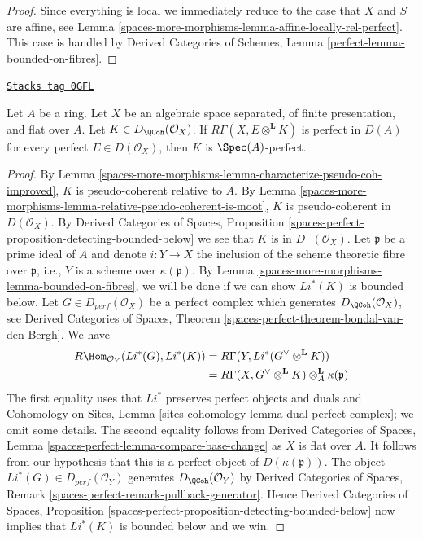 \begin{proof}
Since everything is local we immediately reduce to the
case that $X$ and $S$ are affine, see Lemma
\ref{spaces-more-morphisms-lemma-affine-locally-rel-perfect}.
This case is handled by
Derived Categories of Schemes, Lemma \ref{perfect-lemma-bounded-on-fibres}.
\end{proof}

\begin{lemma}
\label{spaces-more-morphisms-lemma-characterize-relatively-perfect}
\href{https://stacks.math.columbia.edu/tag/0GFL}{\texttt{Stacks tag 0GFL}}

Let $A$ be a ring. Let $X$ be an algebraic space separated, of
finite presentation, and flat over $A$. Let $K \in D_\QCoh(\mathcal{O}_X)$.
If  $R \Gamma (X, E \otimes^\mathbf{L} K)$ is perfect in
$D(A)$ for every perfect $E \in D(\mathcal{O}_X)$, then $K$ is
$\Spec(A)$-perfect.
\end{lemma}

\begin{proof}
By Lemma \ref{spaces-more-morphisms-lemma-characterize-pseudo-coh-improved},
$K$ is pseudo-coherent relative to $A$. By Lemma
\ref{spaces-more-morphisms-lemma-relative-pseudo-coherent-is-moot},
$K$ is pseudo-coherent in $D(\mathcal{O}_X)$.
By Derived Categories of Spaces, Proposition
\ref{spaces-perfect-proposition-detecting-bounded-below}
we see that $K$ is in $D^-(\mathcal{O}_X)$.
Let $\mathfrak{p}$ be a prime ideal of $A$ and denote
$i : Y \to X$ the inclusion of the scheme theoretic
fibre over $\mathfrak{p}$, i.e., $Y$ is a scheme over $\kappa(\mathfrak p)$.
By Lemma \ref{spaces-more-morphisms-lemma-bounded-on-fibres},
we will be done if we can show  $Li^*(K)$ is bounded below.
Let $G \in D_{perf} (\mathcal{O}_X)$ be a perfect
complex which generates $D_\QCoh (\mathcal{O}_X)$,
see Derived Categories of Spaces, Theorem
\ref{spaces-perfect-theorem-bondal-van-den-Bergh}.
We have
\begin{align*}
R\Hom _{\mathcal{O}_Y}(Li^*(G), Li^*(K))
& =
R\Gamma(Y, Li^*(G ^\vee \otimes ^\mathbf{L} K)) \\
& =
R\Gamma(X, G^\vee \otimes ^{\mathbf{L}} K)
\otimes^\mathbf{L}_A \kappa(\mathfrak{p})
\end{align*}
The first equality uses that $Li^*$ preserves perfect objects and duals
and Cohomology on Sites, Lemma
\ref{sites-cohomology-lemma-dual-perfect-complex}; we omit
some details. The second equality follows from
Derived Categories of Spaces, Lemma
\ref{spaces-perfect-lemma-compare-base-change}
as $X$ is flat over $A$. It follows from our hypothesis that this is a
perfect object of $D(\kappa(\mathfrak{p}))$. The object
$Li^*(G) \in D_{perf}(\mathcal{O}_Y)$  generates $D_\QCoh(\mathcal{O}_Y)$ by
Derived Categories of Spaces, Remark
\ref{spaces-perfect-remark-pullback-generator}.
Hence Derived Categories of Spaces, Proposition
\ref{spaces-perfect-proposition-detecting-bounded-below}
now implies that $Li^*(K)$ is bounded below and we win.
\end{proof}

